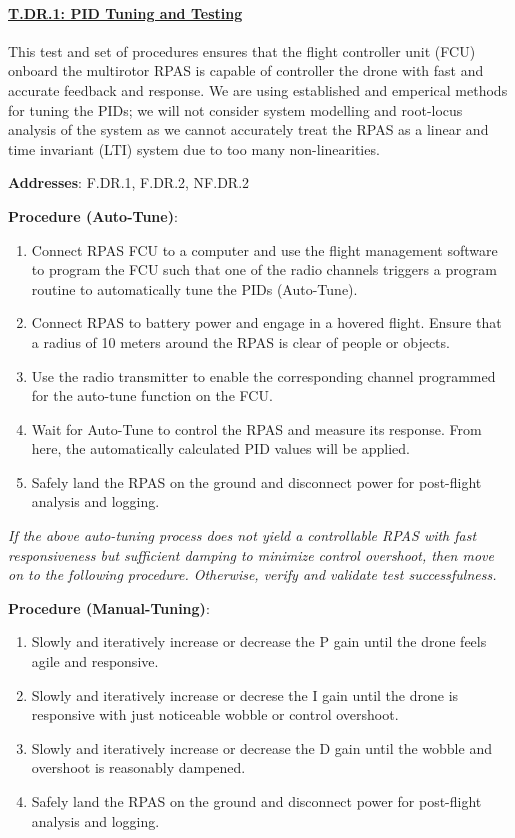 \paragraph{\underline{T.DR.1: PID Tuning and Testing}}

This test and set of procedures ensures that the flight controller unit (FCU) onboard the multirotor RPAS is capable of controller the drone with fast and accurate feedback and response. We are using established and emperical methods for tuning the PIDs; we will not consider system modelling and root-locus analysis of the system as we cannot accurately treat the RPAS as a linear and time invariant (LTI) system due to too many non-linearities.

\textbf{Addresses}: F.DR.1, F.DR.2, NF.DR.2

\textbf{Procedure (Auto-Tune)}:
\begin{enumerate}[noitemsep]
    \item Connect RPAS FCU to a computer and use the flight management software to program the FCU such that one of the radio channels triggers a program routine to automatically tune the PIDs (Auto-Tune).
    \item Connect RPAS to battery power and engage in a hovered flight. Ensure that a radius of 10 meters around the RPAS is clear of people or objects.
    \item Use the radio transmitter to enable the corresponding channel programmed for the auto-tune function on the FCU.
    \item Wait for Auto-Tune to control the RPAS and measure its response. From here, the automatically calculated PID values will be applied.
    \item Safely land the RPAS on the ground and disconnect power for post-flight analysis and logging.
\end{enumerate}

\textit{If the above auto-tuning process does not yield a controllable RPAS with fast responsiveness but sufficient damping to minimize control overshoot, then move on to the following procedure. Otherwise, verify and validate test successfulness.}

\textbf{Procedure (Manual-Tuning)}:
\begin{enumerate}[noitemsep]
    \item Slowly and iteratively increase or decrease the P gain until the drone feels agile and responsive.
    \item Slowly and iteratively increase or decrese the I gain until the drone is responsive with just noticeable wobble or control overshoot.
    \item Slowly and iteratively increase or decrease the D gain until the wobble and overshoot is reasonably dampened.
    \item Safely land the RPAS on the ground and disconnect power for post-flight analysis and logging.
\end{enumerate}

